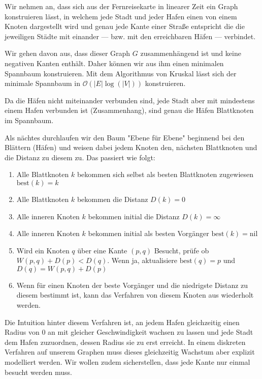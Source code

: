 \documentclass[parskip=half,a4paper]{scrartcl}
\begin{document}
Wir nehmen an, dass sich aus der Fernreisekarte in linearer Zeit ein Graph konstruieren lässt, in welchem jede Stadt und jeder Hafen einen von einem Knoten dargestellt wird und genau jede Kante einer Stra{\ss}e entspricht die die jeweiligen Städte mit einander --- bzw. mit den erreichbaren Häfen --- verbindet.

Wir gehen davon aus, dass dieser Graph $G$ zusammenhängend ist und keine negativen Kanten enthält. Daher können wir aus ihm einen minimalen Spannbaum konstruieren. Mit dem Algorithmus von Kruskal lässt sich der minimale Spannbaum in \(\mathcal{O}(|E|\log(|V|))\) konstruieren.

Da die Häfen nicht miteinander verbunden sind, jede Stadt aber mit mindestens einem Hafen verbunden ist (Zusammenhang), sind genau die Häfen Blattknoten im Spannbaum.

Als nächtes durchlaufen wir den Baum "Ebene für Ebene" beginnend bei den Blättern (Häfen) und weisen dabei jedem Knoten den, nächsten Blattknoten und die Distanz zu diesem zu. Das passiert wie folgt:

\begin{enumerate}
    \item Alle Blattknoten $k$ bekommen sich selbst als besten Blattknoten zugewiesen $\text{best}(k) = k$
    \item Alle Blattknoten $k$ bekommen die Distanz $D(k) = 0$
    \item Alle inneren Knoten $k$ bekommen initial die Distanz $D(k) = \infty$
    \item Alle inneren Knoten $k$ bekommen initial als besten Vorgänger $\text{best}(k) = \text{nil}$
    \item Wird ein Knoten $q$ über eine Kante $(p,q)$ Besucht, prüfe ob $W(p,q) + D(p) < D(q)$. Wenn ja, aktualisiere $\text{best}(q) = p$ und $D(q) = W(p,q) + D(p)$
    \item Wenn für einen Knoten der beste Vorgänger und die niedrigste Distanz zu diesem bestimmt ist, kann das Verfahren von diesem Knoten aus wiederholt werden.
\end{enumerate}

Die Intuition hinter diesem Verfahren ist, an jedem Hafen gleichzeitig einen Radius von 0 an mit gleicher Geschwindigkeit wachsen zu lassen und jede Stadt dem Hafen zuzuordnen, dessen Radius sie zu erst erreicht. In einem diskreten Verfahren auf unserem Graphen muss dieses gleichzeitig Wachstum aber explizit modelliert werden. Wir wollen zudem sicherstellen, dass jede Kante nur einmal besucht werden muss.
\end{document}
